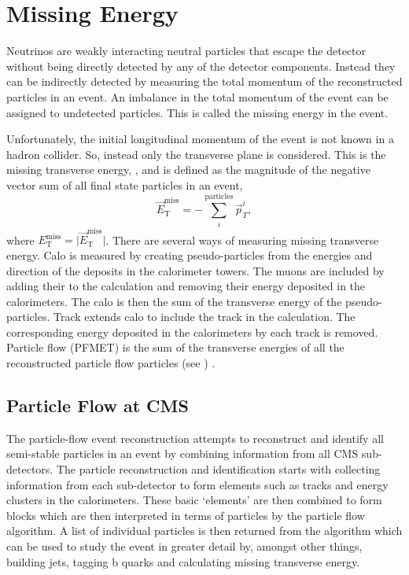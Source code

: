 \section{Missing Energy} 
Neutrinos are weakly interacting neutral particles that escape the
detector without being directly detected by any of the detector components. 
Instead they can be indirectly detected by measuring the total momentum of the
reconstructed particles in an event.
An imbalance in the total momentum of the event can be assigned to undetected
particles. This is called the missing energy in the event.

Unfortunately, the initial longitudinal momentum of the event is not known in a
hadron collider. So, instead only the transverse plane is
considered. This is the missing transverse energy, \ETm, and is defined as
the magnitude of the negative vector sum of all final state particles in an event,
\begin{equation}
\vec{E}^{\text{miss}}_{\text{T}} = -\sum_i^{\text{particles}} \vec{p}_{T}^{i},
\end{equation}
where ${E}^{\text{miss}}_{\text{T}} = \vert \vec{E}^{\text{miss}}_{\text{T}}
\vert $.
There are several ways of measuring missing transverse energy.
Calo \ETm is measured by creating pseudo-particles from the energies and
direction of the deposits in the calorimeter towers. The muons are included by
adding their \Pt to the calculation and removing their energy deposited in the
calorimeters. The calo \ETm is then the sum of the transverse energy of the
pseudo-particles.
Track \ETm extends calo \ETm to include the track \Pt in the calculation.  The
corresponding energy deposited in the calorimeters by each track is removed.
Particle flow \ETm (PFMET) is the sum of the transverse energies of all the
reconstructed particle flow particles (see ) \cite{PF}.

\subsection{Particle Flow at CMS}
\label{sec:pf}

The particle-flow event reconstruction attempts to reconstruct and identify all
semi-stable particles in an event by combining information from all CMS
sub-detectors. The particle reconstruction and identification starts with
collecting information from each sub-detector to form elements such as tracks
and energy clusters in the calorimeters. These basic `elements' are then
combined to form blocks which are then interpreted in terms of particles by the
particle flow algorithm. A list of individual particles is then returned from
the algorithm which can be used to study the event in greater detail by,
amongst other things, building jets, tagging b quarks and calculating missing
transverse energy\cite{PF}.

